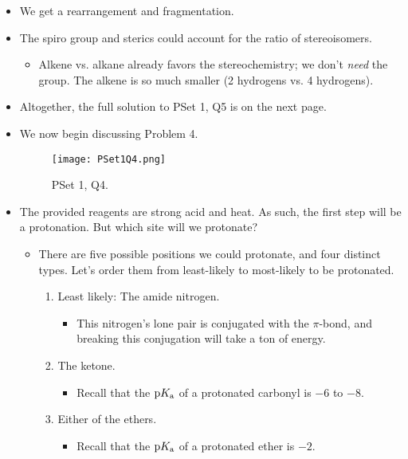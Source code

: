 \documentclass[../notes.tex]{subfiles}
\begin{document}
\begin{itemize}
\begin{itemize}
    \end{itemize}
    \item We get a rearrangement and fragmentation.
    \item The spiro group and sterics could account for the ratio of stereoisomers.
    \begin{itemize}
        \item Alkene vs. alkane already favors the stereochemistry; we don't \emph{need} the  group. The alkene is so much smaller (2 hydrogens vs. 4 hydrogens).
    \end{itemize}
    \item Altogether, the full solution to PSet 1, Q5 is on the next page.
    
    \item We now begin discussing Problem 4.
    \begin{figure}[h!]
        \centering
        \texttt{[image: PSet1Q4.png]}
        \caption{PSet 1, Q4.}
        \label{fig:PSet1Q4}
    \end{figure}
    \item The provided reagents are strong acid and heat. As such, the first step will be a protonation. But which site will we protonate?
    \begin{itemize}
        \item There are five possible positions we could protonate, and four distinct types. Let's order them from least-likely to most-likely to be protonated.
        \begin{enumerate}
            \item Least likely: The amide nitrogen.
            \begin{itemize}
                \item This nitrogen's lone pair is conjugated with the  $\pi$-bond, and breaking this conjugation will take a ton of energy.
            \end{itemize}
            \item The ketone.
            \begin{itemize}
                \item Recall that the $\textup{p}K_\textup{a}$ of a protonated carbonyl is $-6$ to $-8$.
            \end{itemize}
            \item Either of the ethers.
            \begin{itemize}
                \item Recall that the $\textup{p}K_\textup{a}$ of a protonated ether is $-2$.

\end{itemize}
\end{enumerate}
\end{itemize}
\end{itemize}
\end{document}
